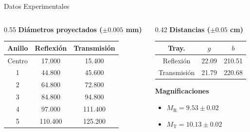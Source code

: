 \documentclass[aspectratio=169]{beamer}
\begin{document}
\begin{frame}{Datos Experimentales}
    \begin{columns}[T]
        \begin{column}{0.55\textwidth}
            \textbf{\textcolor{neonblue}{Diámetros proyectados ($\pm 0.005$ mm)}}
            \vspace{0.2cm}
            \begin{table}
                \centering
                \small
                \begin{tabular}{ccc}
                \hline
                \textbf{Anillo} & \textbf{Reflexión} & \textbf{Transmisión} \\ \hline
                Centro & 17.000 & 15.400 \\
                1 & 44.800 & 45.600 \\
                2 & 64.800 & 72.800 \\
                3 & 84.800 & 94.800 \\
                4 & 97.000 & 111.400 \\
                5 & 110.400 & 125.200 \\ \hline
                \end{tabular}
            \end{table}
        \end{column}
        \begin{column}{0.42\textwidth}
            \textbf{\textcolor{neonblue}{Distancias ($\pm 0.05$ cm)}}
            \vspace{0.2cm}
            \begin{table}
                \centering
                \small
                \begin{tabular}{ccc}
                \hline
                \textbf{Tray.} & \textbf{$g$} & \textbf{$b$} \\ \hline
                Reflexión & 22.09 & 210.51 \\
                Transmisión & 21.79 & 220.68 \\ \hline
                \end{tabular}
            \end{table}
            \vspace{0.3cm}
            \textbf{\textcolor{neonblue}{Magnificaciones}}
            \begin{itemize}
                \item $M_{\mathrm R} = 9.53 \pm 0.02$
                \item $M_{\mathrm T} = 10.13 \pm 0.02$
            \end{itemize}
        \end{column}
    \end{columns}
\end{frame}
\end{document}
